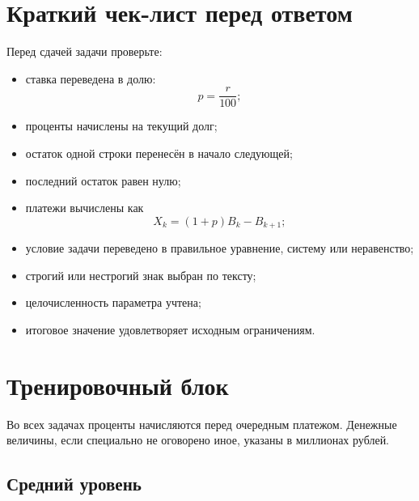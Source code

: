 \documentclass[a4paper,12pt]{article}
\begin{document}

\section{Краткий чек-лист перед ответом}

Перед сдачей задачи проверьте:

\begin{itemize}[leftmargin=1.7em,itemsep=0.4em]
    \item ставка переведена в долю:
    \[
    p=\frac r{100};
    \]

    \item проценты начислены на текущий долг;

    \item остаток одной строки перенесён в начало следующей;

    \item последний остаток равен нулю;

    \item платежи вычислены как
    \[
    X_k=(1+p)B_k-B_{k+1};
    \]

    \item условие задачи переведено в правильное уравнение,
    систему или неравенство;

    \item строгий или нестрогий знак выбран по тексту;

    \item целочисленность параметра учтена;

    \item итоговое значение удовлетворяет исходным ограничениям.
\end{itemize}


\newpage

\section*{Тренировочный блок}

Во всех задачах проценты начисляются перед очередным платежом.
Денежные величины, если специально не оговорено иное, указаны в миллионах
рублей.

\subsection*{Средний уровень}
\end{document}
